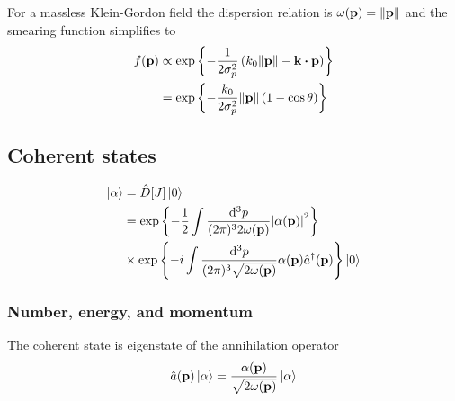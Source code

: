 For a massless Klein-Gordon field the dispersion relation is $\omega(\vb{p})=\norm{\vb{p}}$ and the smearing function simplifies to
\begin{equation}
	\begin{split}
		f(\vb{p})
		&\propto
		\exp\left\{
			-
			\frac{1}{2\sigma_p^2}
			\left(
				k_0
				\norm{\vb{p}}
				-
				\vb{k}\vdot\vb{p}
			\right)
		\right\}
		\\
		&=
		\exp\left\{
			-
			\frac{k_0}{2\sigma_p^2}
			\norm{\vb{p}}
			\left(
				1	
				-
				\cos\theta
			\right)
		\right\}
	\end{split}
\end{equation}

\subsection{Coherent states}


\begin{equation}
	\begin{split}
		\ket{\alpha}
		&=
		\hat{D}[J]
		\ket{0}
		\\
		&=
		\exp\left\{
			-
			\frac{1}{2}
			\int\frac{\dd[3]{p}}{(2\pi)^32\omega(\vb{p})}
			\abs{\alpha(\vb{p})}^2
		\right\}
		\\
		&\times
		\exp\left\{
			-i
			\int\frac{\dd[3]{p}}{(2\pi)^3\sqrt{2\omega(\vb{p})}}
			\alpha(\vb{p})
			\hat{a}^\dagger(\vb{p})
		\right\}
		\ket{0}
	\end{split}
\end{equation}

\subsubsection{Number, energy, and momentum}

The coherent state is eigenstate of the annihilation operator
\begin{equation}
	\hat{a}(\vb{p})
	\ket{\alpha}
	=
	\frac{\alpha(\vb{p})}{\sqrt{2\omega(\vb{p})}}
	\ket{\alpha}
\end{equation}

